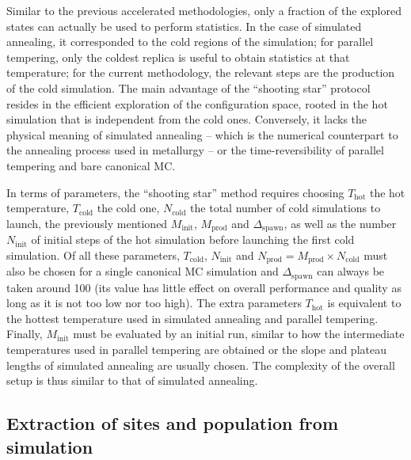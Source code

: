 \documentclass[main.tex]{subfiles}
\begin{document}
Similar to the previous accelerated methodologies, only a fraction of the explored states can actually be used to perform statistics. In the case of simulated annealing, it corresponded to the cold regions of the simulation; for parallel tempering, only the coldest replica is useful to obtain statistics at that temperature; for the current methodology, the relevant steps are the production of the cold simulation. The main advantage of the ``shooting star'' protocol resides in the efficient exploration of the configuration space, rooted in the hot simulation that is independent from the cold ones. Conversely, it lacks the physical meaning of simulated annealing -- which is the numerical counterpart to the annealing process used in metallurgy -- or the time-reversibility of parallel tempering and bare canonical MC.

In terms of parameters, the ``shooting star'' method requires choosing $T_\text{hot}$ the hot temperature, $T_\text{cold}$ the cold one, $N_\text{cold}$ the total number of cold simulations to launch, the previously mentioned $M_\text{init}$, $M_\text{prod}$ and $\Delta_\text{spawn}$, as well as the number $N_\text{init}$ of initial steps of the hot simulation before launching the first cold simulation. Of all these parameters, $T_\text{cold}$, $N_\text{init}$ and $N_\text{prod} = M_\text{prod}\times N_\text{cold}$ must also be chosen for a single canonical MC simulation and $\Delta_\text{spawn}$ can always be taken around 100 (its value has little effect on overall performance and quality as long as it is not too low nor too high). The extra parameters $T_\text{hot}$ is equivalent to the hottest temperature used in simulated annealing and parallel tempering. Finally, $M_\text{init}$ must be evaluated by an initial run, similar to how the intermediate temperatures used in parallel tempering are obtained or the slope and plateau lengths of simulated annealing are usually chosen. The complexity of the overall setup is thus similar to that of simulated annealing.


\subsection{Extraction of sites and population from simulation}

\label{siteextraction}

\end{document}
